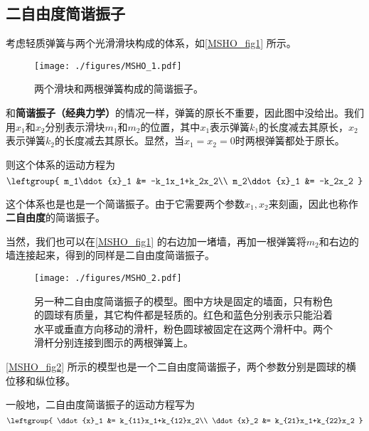

\subsection{二自由度简谐振子}

考虑轻质弹簧与两个光滑滑块构成的体系，如\autoref{MSHO_fig1} 所示。

\begin{figure}[ht]
\centering
\texttt{[image: ./figures/MSHO\_1.pdf]}
\caption{两个滑块和两根弹簧构成的简谐振子。} \label{MSHO_fig1}
\end{figure}

和\textbf{简谐振子（经典力学）}的情况一样，弹簧的原长不重要，因此图中没给出。我们用$x_1$和$x_2$分别表示滑块$m_1$和$m_2$的位置，其中$x_1$表示弹簧$k_1$的长度减去其原长，$x_2$表示弹簧$k_2$的长度减去其原长。显然，当$x_1=x_2=0$时两根弹簧都处于原长。

则这个体系的运动方程为
\begin{equation}
\leftgroup{
    m_1\ddot{x}_1 &= -k_1x_1+k_2x_2\\
    m_2\ddot{x}_1 &= -k_2x_2
}
\end{equation}

这个体系也是也是一个简谐振子。由于它需要两个参数$x_1, x_2$来刻画，因此也称作\textbf{二自由度}的简谐振子。

当然，我们也可以在\autoref{MSHO_fig1} 的右边加一堵墙，再加一根弹簧将$m_2$和右边的墙连接起来，得到的同样是二自由度简谐振子。


\begin{figure}[ht]
\centering
\texttt{[image: ./figures/MSHO\_2.pdf]}
\caption{另一种二自由度简谐振子的模型。图中方块是固定的墙面，只有粉色的圆球有质量，其它构件都是轻质的。红色和蓝色分别表示只能沿着水平或垂直方向移动的滑杆，粉色圆球被固定在这两个滑杆中。两个滑杆分别连接到图示的两根弹簧上。} \label{MSHO_fig2}
\end{figure}

\autoref{MSHO_fig2} 所示的模型也是一个二自由度简谐振子，两个参数分别是圆球的横位移和纵位移。

一般地，二自由度简谐振子的运动方程写为
\begin{equation}\label{MSHO_eq1}
\leftgroup{
    \ddot{x}_1 &= k_{11}x_1+k_{12}x_2\\
    \ddot{x}_2 &= k_{21}x_1+k_{22}x_2
}
\end{equation}


